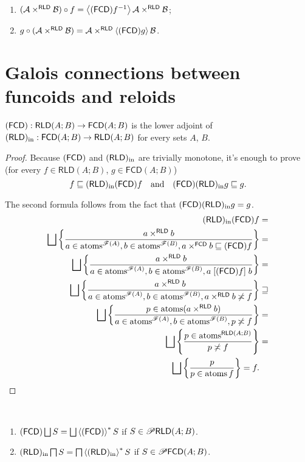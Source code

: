 \begin{cor}
~
\begin{enumerate}
\item $(\mathcal{A}\times^{\mathsf{RLD}}\mathcal{B})\circ f=\left\langle (\mathsf{FCD}) f^{-1}\right\rangle\mathcal{A}\times^{\mathsf{RLD}}\mathcal{B}$;
\item $g\circ(\mathcal{A}\times^{\mathsf{RLD}}\mathcal{B})=\mathcal{A}\times^{\mathsf{RLD}}\left\langle (\mathsf{FCD}) g\right\rangle\mathcal{B}$.
\end{enumerate}
\end{cor}

\section{Galois connections
between funcoids and reloids}
\begin{thm}
$(\mathsf{FCD}):\mathsf{RLD}(A;B)\rightarrow\mathsf{FCD}(A;B)$ is the lower
adjoint of $(\mathsf{RLD})_{\mathrm{in}}:\mathsf{FCD}(A;B)\rightarrow\mathsf{RLD}(A;B)$
for every sets $A$, $B$.\end{thm}
\begin{proof}
Because $(\mathsf{FCD})$ and $(\mathsf{RLD})_{\mathrm{in}}$ are trivially monotone, it's enough
to prove (for every $f\in\mathsf{RLD}(A;B)$, $g\in\mathsf{FCD}(A;B)$)
\[
f\sqsubseteq(\mathsf{RLD})_{\mathrm{in}}(\mathsf{FCD}) f\quad\text{and}\quad(\mathsf{FCD})(\mathsf{RLD})_{\mathrm{in}} g\sqsubseteq g.
\]


The second formula follows from the fact that $(\mathsf{FCD})(\mathsf{RLD})_{\mathrm{in}} g=g$.
\begin{align*}
(\mathsf{RLD})_{\mathrm{in}}(\mathsf{FCD}) f & =\\
\bigsqcup\left\{ \frac{a\times^{\mathsf{RLD}}b}{a\in\operatorname{atoms}^{\mathscr{F}(A)},b\in\operatorname{atoms}^{\mathscr{F}(B)},a\times^{\mathsf{FCD}}b\sqsubseteq(\mathsf{FCD}) f}\right\} & =\\
\bigsqcup\left\{ \frac{a\times^{\mathsf{RLD}}b}{a\in\operatorname{atoms}^{\mathscr{F}(A)},b\in\operatorname{atoms}^{\mathscr{F}(B)},a\mathrel{\left[(\mathsf{FCD}) f\right]}b}\right\} & =\\
\bigsqcup\left\{ \frac{a\times^{\mathsf{RLD}}b}{a\in\operatorname{atoms}^{\mathscr{F}(A)},b\in\operatorname{atoms}^{\mathscr{F}(B)},a\times^{\mathsf{RLD}}b\not\asymp f}\right\} & \sqsupseteq\\
\bigsqcup\left\{ \frac{p\in\operatorname{atoms}(a\times^{\mathsf{RLD}}b)}{a\in\operatorname{atoms}^{\mathscr{F}(A)},b\in\operatorname{atoms}^{\mathscr{F}(B)},p\not\asymp f}\right\} & =\\
\bigsqcup\left\{ \frac{p\in\operatorname{atoms}^{\mathsf{RLD}(A;B)}}{p\not\asymp f}\right\} & =\\
\bigsqcup\left\{ \frac{p}{p\in\operatorname{atoms} f}\right\}=f.
\end{align*}
\end{proof}
\begin{cor}
~
\begin{enumerate}
\item $(\mathsf{FCD})\bigsqcup S=\bigsqcup\left\langle (\mathsf{FCD})\right\rangle ^{\ast}S$ if $S\in\mathscr{P}\mathsf{RLD}(A;B)$.
\item $(\mathsf{RLD})_{\mathrm{in}}\bigsqcap S=\bigsqcap\left\langle (\mathsf{RLD})_{\mathrm{in}}\right\rangle ^{\ast}S$ if $S\in\mathscr{P}\mathsf{FCD}(A;B)$.
\end{enumerate}
\end{cor}
